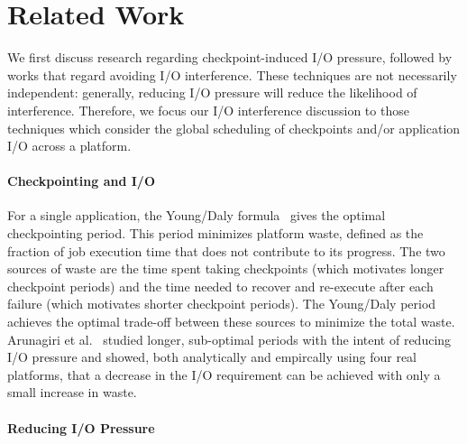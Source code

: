 

\section{Related Work}\label{sec:related}

We first discuss research regarding checkpoint-induced I/O pressure, followed by
works that regard avoiding I/O interference.  These techniques are not necessarily
independent: generally, reducing I/O pressure will reduce the likelihood of
interference.  Therefore, we focus our I/O interference discussion to those
techniques which consider the global scheduling of checkpoints and/or application I/O
across a platform.


\paragraph*{Checkpointing and I/O}

For a single application, the Young/Daly formula~\cite{young74,daly04} gives the
optimal checkpointing period. This period minimizes platform waste, defined as the
fraction of job execution time that does not contribute to its progress.  The two
sources of waste are the time spent taking checkpoints (which motivates longer
checkpoint periods) and the time needed to recover and re-execute after each failure
(which motivates shorter checkpoint periods). The Young/Daly period achieves the
optimal trade-off between these sources to minimize the total waste. Arunagiri et
al.~\cite{Arunagiri2010} studied longer, sub-optimal periods with the intent of
reducing I/O pressure and showed, both analytically and empircally using four real
platforms, that a decrease in the I/O requirement can be achieved with only a small
increase in waste.

\paragraph*{Reducing I/O Pressure}

